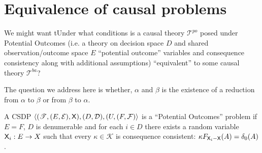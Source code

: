 \section{Equivalence of causal problems}

We might want tUnder what conditions is a causal theory $\mathscr{T}^{po}$ posed under Potential Outcomes (i.e. a theory on decision space $D$ and shared observation/outcome space $E$ ``potential outcome'' variables and consequence consistency along with additional assumptions) ``equivalent'' to some causal theory $\mathscr{T}^{ba}$?

The question we address here is whether,  $\alpha$ and $\beta$ is the existence of a reduction from $\alpha$ to $\beta$ or from $\beta$ to $\alpha$. 


\begin{definition}
A CSDP $\langle (\mathscr{T},(E,\mathcal{E}),\mathsf{X}),(D,\mathcal{D}), (U,(F,\mathcal{F})\rangle$ is a ``Potential Outcomes'' problem if $E=F$, $D$ is denumerable and for each $i\in D$ there exists a random variable $\mathsf{X}_i:E\to X$ such that every $\kappa\in \mathscr{K}$ is consequence consistent: $\kappa F_{\mathsf{X}_i-\mathsf{X}}(A) = \delta_0(A)$.
\end{definition}

